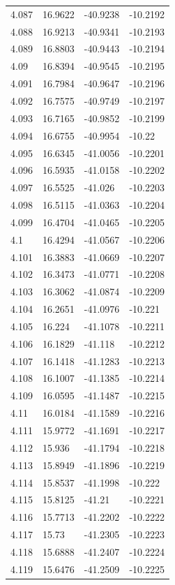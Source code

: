 \begin{tabular}{llll}
4.087 & 16.9622 & -40.9238 & -10.2192 \\
4.088 & 16.9213 & -40.9341 & -10.2193 \\
4.089 & 16.8803 & -40.9443 & -10.2194 \\
4.09 & 16.8394 & -40.9545 & -10.2195 \\
4.091 & 16.7984 & -40.9647 & -10.2196 \\
4.092 & 16.7575 & -40.9749 & -10.2197 \\
4.093 & 16.7165 & -40.9852 & -10.2199 \\
4.094 & 16.6755 & -40.9954 & -10.22 \\
4.095 & 16.6345 & -41.0056 & -10.2201 \\
4.096 & 16.5935 & -41.0158 & -10.2202 \\
4.097 & 16.5525 & -41.026 & -10.2203 \\
4.098 & 16.5115 & -41.0363 & -10.2204 \\
4.099 & 16.4704 & -41.0465 & -10.2205 \\
4.1 & 16.4294 & -41.0567 & -10.2206 \\
4.101 & 16.3883 & -41.0669 & -10.2207 \\
4.102 & 16.3473 & -41.0771 & -10.2208 \\
4.103 & 16.3062 & -41.0874 & -10.2209 \\
4.104 & 16.2651 & -41.0976 & -10.221 \\
4.105 & 16.224 & -41.1078 & -10.2211 \\
4.106 & 16.1829 & -41.118 & -10.2212 \\
4.107 & 16.1418 & -41.1283 & -10.2213 \\
4.108 & 16.1007 & -41.1385 & -10.2214 \\
4.109 & 16.0595 & -41.1487 & -10.2215 \\
4.11 & 16.0184 & -41.1589 & -10.2216 \\
4.111 & 15.9772 & -41.1691 & -10.2217 \\
4.112 & 15.936 & -41.1794 & -10.2218 \\
4.113 & 15.8949 & -41.1896 & -10.2219 \\
4.114 & 15.8537 & -41.1998 & -10.222 \\
4.115 & 15.8125 & -41.21 & -10.2221 \\
4.116 & 15.7713 & -41.2202 & -10.2222 \\
4.117 & 15.73 & -41.2305 & -10.2223 \\
4.118 & 15.6888 & -41.2407 & -10.2224 \\
4.119 & 15.6476 & -41.2509 & -10.2225 \\

\end{tabular}
